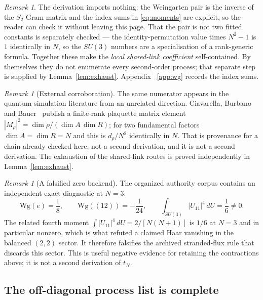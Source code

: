 \documentclass[11pt]{article}
\theoremstyle{plain}
\theoremstyle{definition}
\theoremstyle{remark}
\newtheorem{remark}[theorem]{Remark}
\newcommand{\chk}[1]{}
\begin{document}
\begin{remark}
The derivation imports nothing: the Weingarten pair is the inverse of the
$S_2$ Gram matrix and the index sums in \eqref{eq:moments} are explicit, so
the reader can check it without leaving this page. That the pair is not two
fitted constants is separately checked --- the identity-permutation value times
$N^2-1$ is $1$ identically in $N$, so the $SU(3)$ numbers are a specialisation
of a rank-generic formula. Together these make the \emph{local shared-link
coefficient} self-contained. By themselves they do not enumerate every
second-order process; that separate step is supplied by
Lemma~\ref{lem:exhaust}. Appendix~%
\ref{app:wg} records the index sums.
\chk{the Weingarten route is independent of the corpus}
\end{remark}

\begin{remark}[External corroboration]
The same numerator appears in the quantum-simulation literature from an
unrelated direction. Ciavarella, Burbano and Bauer~\cite{CBB2025} publish a
finite-rank plaquette matrix element
$|M_\rho|^2=\dim\rho/(\dim A\,\dim R)$; for two fundamental factors
$\dim A=\dim R=N$ and this is $d_\rho/N^2$ identically in $N$. That is
provenance for a chain already checked here, not a second derivation, and it
is not a second derivation. The exhaustion of the shared-link routes is
proved independently in Lemma~\ref{lem:exhaust}.
\chk{the published dimension-ratio matrix element is this registry's weight formula}
\end{remark}

\begin{remark}[A falsified zero backend]
The organized authority corpus contains an independent exact diagnostic at
$N=3$:
\[
 \mathrm{Wg}(e)=\frac18,\qquad
 \mathrm{Wg}((12))=-\frac1{24},\qquad
 \int_{SU(3)}|U_{11}|^4\,dU=\frac16\ne0.
\]
The related fourth moment $\int|U_{11}|^4\,dU=2/[N(N+1)]$ is $1/6$ at $N=3$
and in particular nonzero, which is what refuted a claimed Haar vanishing in
the balanced $(2,2)$ sector. It therefore falsifies the archived
stranded-flux rule that discards this sector. This is useful negative
evidence for retaining the contractions above; it is not a second derivation
of $t_N$.
\chk{the fourth moment integral |U\_11|\^{}4 = 1/6 at N = 3}
\end{remark}

\subsection{The off-diagonal process list is complete}
\label{sec:complete}
\end{document}

